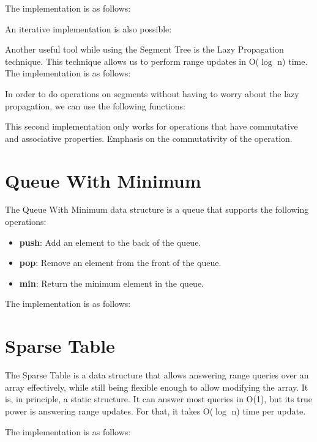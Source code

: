 The implementation is as follows:



An iterative implementation is also possible:




Another useful tool while using the Segment Tree is the Lazy Propagation technique. This technique allows us to perform range updates in O($\log$ n) time. The implementation is as follows:





In order to do operations on segments without having to worry about the lazy propagation, we can use the following functions:



This second implementation only works for operations that have commutative and associative properties. Emphasis on the commutativity of the operation.

\section{Queue With Minimum}

The Queue With Minimum data structure is a queue that supports the following operations:

\begin{itemize}
\item \textbf{push}: Add an element to the back of the queue.
\item \textbf{pop}: Remove an element from the front of the queue.
\item \textbf{min}: Return the minimum element in the queue.
\end{itemize}

The implementation is as follows:




\section{Sparse Table}

The Sparse Table is a data structure that allows answering range queries over an array effectively, while still being flexible enough to allow modifying the array. It is, in principle, a static structure. It can answer most queries in O(1), but its true power is answering range updates. For that, it takes O($\log$ n) time per update.

The implementation is as follows:





